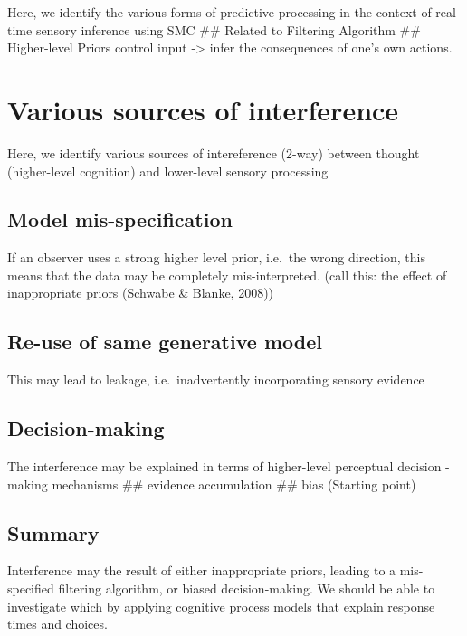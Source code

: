 \documentclass[english,floatsintext,man]{apa6}
\theoremstyle{definition}
\theoremstyle{definition}
\theoremstyle{remark}
\begin{document}
Here, we identify the various forms of predictive processing in the
context of real-time sensory inference using SMC \#\# Related to
Filtering Algorithm \#\# Higher-level Priors control input
-\textgreater{} infer the consequences of one's own actions.

\section{Various sources of
interference}\label{various-sources-of-interference}

Here, we identify various sources of intereference (2-way) between
thought (higher-level cognition) and lower-level sensory processing

\subsection{Model mis-specification}\label{model-mis-specification}

If an observer uses a strong higher level prior, i.e.~the wrong
direction, this means that the data may be completely mis-interpreted.
(call this: the effect of inappropriate priors (Schwabe \& Blanke,
2008))

\subsection{Re-use of same generative
model}\label{re-use-of-same-generative-model}

This may lead to leakage, i.e.~inadvertently incorporating sensory
evidence

\subsection{Decision-making}\label{decision-making}

The interference may be explained in terms of higher-level perceptual
decision -making mechanisms \#\# evidence accumulation \#\# bias
(Starting point)

\subsection{Summary}\label{summary-1}

Interference may the result of either inappropriate priors, leading to a
mis-specified filtering algorithm, or biased decision-making. We should
be able to investigate which by applying cognitive process models that
explain response times and choices.
\end{document}
